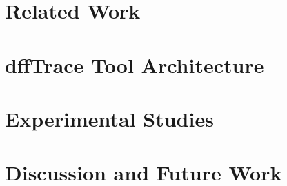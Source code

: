 \documentclass[conference]{IEEEtran}
\begin{document}

\section{Related Work}
\label{sec:related}



\section{dffTrace Tool Architecture}
\label{sec:components}



\section{Experimental Studies}
\label{sec:experimental}




    
\section{Discussion and Future Work}
\label{sec:discussion}




%
%

\clearpage

%
\end{document}
